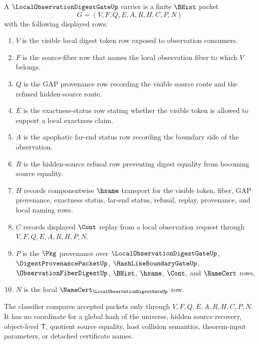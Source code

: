 \begin{definition}
\label{def:local-observation-digest-gate-carrier}
A $\LocalObservationDigestGateUp$ carrier is a finite $\BHist$ packet
$$
G=(V,F,Q,E,A,R,H,C,P,N)
$$
with the following displayed rows:
\begin{enumerate}
\item $V$ is the visible local digest token row exposed to observation consumers.
\item $F$ is the source-fiber row that names the local observation fiber to which $V$ belongs.
\item $Q$ is the GAP provenance row recording the visible source route and the refused hidden-source route.
\item $E$ is the exactness-status row stating whether the visible token is allowed to support a local exactness claim.
\item $A$ is the apophatic far-end status row recording the boundary side of the observation.
\item $R$ is the hidden-source refusal row preventing digest equality from becoming source equality.
\item $H$ records componentwise $\hsame$ transport for the visible token, fiber, GAP provenance, exactness status, far-end status, refusal, replay, provenance, and local naming rows.
\item $C$ records displayed $\Cont$ replay from a local observation request through $V,F,Q,E,A,R,H,P,N$.
\item $P$ is the $\Pkg$ provenance over $\LocalObservationDigestGateUp$, $\DigestProvenancePacketUp$, $\HashLikeBoundaryGateUp$, $\ObservationFiberDigestUp$, $\BHist$, $\hsame$, $\Cont$, and $\NameCert$ rows.
\item $N$ is the local $\NameCert_{\LocalObservationDigestGateUp}$ row.
\end{enumerate}
The classifier compares accepted packets only through $V,F,Q,E,A,R,H,C,P,N$. It has no coordinate for a global hash of the universe, hidden source recovery, object-level $\mathsf{T}$, quotient source equality, host collision semantics, theorem-input parameters, or detached certificate names.
\end{definition}


